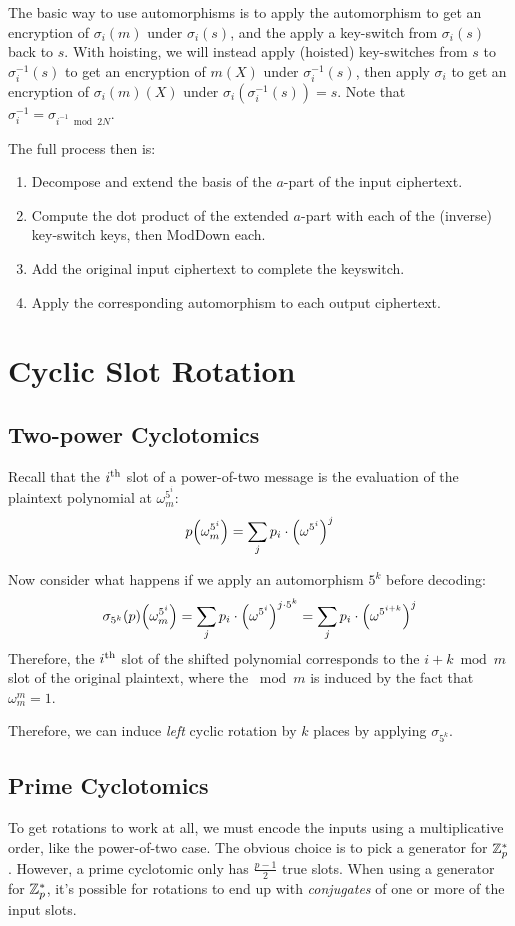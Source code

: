 \documentclass[../fheimpl.tex]{subfiles}
\begin{document}
The basic way to use automorphisms is to apply the automorphism to get an encryption of $\sigma_i(m)$ under $\sigma_i(s)$, and the apply a key-switch from $\sigma_i(s)$ back to $s$. With hoisting, we will instead apply (hoisted) key-switches from $s$ to $\sigma_i^{-1}(s)$ to get an encryption of $m(X)$ under $\sigma_i^{-1}(s)$, then apply $\sigma_i$ to get an encryption of $\sigma_i(m)(X)$ under $\sigma_i(\sigma_i^{-1}(s)) = s$. Note that $\sigma_i^{-1}=\sigma_{i^{-1} \bmod 2N}$.

The full process then is:
\begin{enumerate}
	\item Decompose and extend the basis of the $a$-part of the input ciphertext.
	\item Compute the dot product of the extended $a$-part with each of the (inverse) key-switch keys, then ModDown each.
	\item Add the original input ciphertext to complete the keyswitch.
	\item Apply the corresponding automorphism to each output ciphertext.
\end{enumerate}

\section{Cyclic Slot Rotation}
\subsection{Two-power Cyclotomics}
Recall that the $i^{\mathrm{th}}$ slot of a power-of-two message is the evaluation of the plaintext polynomial at $\omega_m^{5^i}$:
\[p\parens*{\omega_m^{5^i}} = \sum_j p_i\cdot \parens*{\omega^{5^i}}^j\]

Now consider what happens if we apply an automorphism $5^k$ before decoding:
\[\sigma_{5^k}\parens*{p}\parens*{\omega_m^{5^i}} = \sum_j p_i\cdot \parens*{\omega^{5^i}}^{j\cdot 5^k}= \sum_j p_i\cdot \parens*{\omega^{5^{i+k}}}^j\]
Therefore, the $i^{\mathrm{th}}$ slot of the shifted polynomial corresponds to the $i+k\bmod m$ slot of the original plaintext, where the $\bmod m$ is induced by the fact that $\omega_m^m=1$.

Therefore, we can induce \emph{left} cyclic rotation by $k$ places by applying $\sigma_{5^k}$.

\subsection{Prime Cyclotomics}
To get rotations to work at all, we must encode the inputs using a multiplicative order, like the power-of-two case. The obvious choice is to pick a generator for $\mathbb{Z}_p^*$. However, a prime cyclotomic only has $\frac{p-1}{2}$ true slots. When using a generator for $\mathbb{Z}_p^*$, it's possible for rotations to end up with \emph{conjugates} of one or more of the input slots. 
\end{document}
